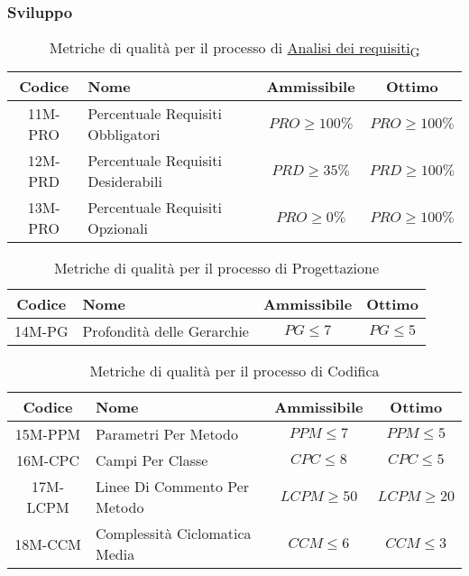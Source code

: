 \newpage
\subsubsection{Sviluppo}
\begin{table}[h!]
	\centering
	\begin{tabular}{ | c | l | c | c | }
		\hline
		Codice   & Nome                               & Ammissibile      & Ottimo           \\
		\hline
		11M-PRO  & Percentuale Requisiti Obbligatori  & $PRO \geq 100\%$ & $PRO \geq 100\%$ \\
		12M-PRD  & Percentuale Requisiti Desiderabili & $PRD \geq 35\%$  & $PRD \geq 100\%$ \\
		13M-PRO  & Percentuale Requisiti Opzionali    & $PRO \geq 0\%$   & $PRO \geq 100\%$ \\
		\hline
	\end{tabular}
	\caption{Metriche di qualità per il processo di \href{https://7last.github.io/docs/rtb/documentazione-interna/glossario\#analisi-dei-requisiti}{Analisi dei requisiti\textsubscript{G}}}
\end{table}

\begin{table}[h!]
	\centering
	\begin{tabular}{ | c | l | c | c | }
		\hline
		Codice   & Nome                       & Ammissibile & Ottimo           \\
		\hline
		14M-PG   & Profondità delle Gerarchie & $PG \leq 7$ & $PG \leq 5$      \\
		\hline
	\end{tabular}
	\caption{Metriche di qualità per il processo di Progettazione}
\end{table}

\begin{table}[h!]
	\centering
	\begin{tabular}{ | c | l | c | c | }
		\hline
		Codice   & Nome                          & Ammissibile    & Ottimo         \\
		\hline
		15M-PPM  & Parametri Per Metodo          & $PPM \leq 7$   & $PPM \leq 5$   \\
		16M-CPC  & Campi Per Classe 	         & $CPC \leq 8$   & $CPC \leq 5$   \\
		17M-LCPM & Linee Di Commento Per Metodo  & $LCPM \geq 50$ & $LCPM \geq 20$ \\
		18M-CCM  & Complessità Ciclomatica Media & $CCM \leq 6$   & $CCM \leq 3$   \\
		\hline
	\end{tabular}
	\caption{Metriche di qualità per il processo di Codifica}
\end{table}

